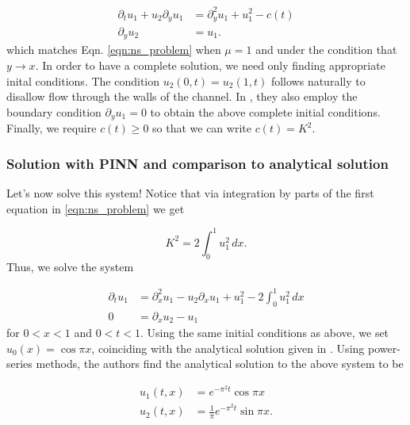 \documentclass{CUP-JNL-DTM}%
\theoremstyle{definition}
\numberwithin{equation}{section}
\begin{document}
\begin{equation}
    \begin{split}
        \partial_t u_1 + u_2\partial_yu_1 & = \partial_y^2 u_1 + u_1^2 - c(t) \\
        \partial_y u_2 & = u_1. 
    \end{split}
\end{equation}
which matches Eqn. \ref{eqn:ns_problem} when $\mu = 1$ and under the condition that $y \rightarrow x$. In order to have a complete solution, we need only finding appropriate inital conditions. The condition $u_2(0,t) = u_2(1,t)$ follows naturally to disallow flow through the walls of the channel. In \cite{buddBlowupSystemPartial1994}, they also employ the boundary condition $\partial_y u_1 = 0$ to obtain the above complete initial conditions. Finally, we require $c(t) \ge 0$ so that we can write $c(t) = K^2$. 

\subsubsection{Solution with PINN and comparison to analytical solution}

Let's now solve this system! Notice that via integration by parts of the first equation in \ref{eqn:ns_problem} we get

\begin{equation}
    K^2 = 2\int_0^1 u_1^2 \, dx. 
\end{equation}
Thus, we solve the system

\begin{equation}
    \begin{split}
        \partial_t u_1 & = \partial_x^2 u_1 - u_2 \partial_x u_1 + u_1^2 - 2\int_0^1 u_1^2 \,dx \\
        0 & = \partial_x u_2 - u_1
    \end{split}
\end{equation}
for $0 < x < 1$ and $0 < t < 1$. Using the same initial conditions as above, we set $u_0(x) = \cos \pi x$, coinciding with the analytical solution given in \cite{benhammoudaAnalyticalSolutionsSystems2014}. Using power-series methods, the authors find the analytical solution to the above system to be

\begin{equation}
    \begin{split}
        u_1(t,x) & = e^{-\pi^2t}\cos \pi x \\
        u_2(t,x) & = \frac{1}{\pi}e^{-\pi^2t} \sin \pi x. 
    \end{split}
\end{equation}
\end{document}
